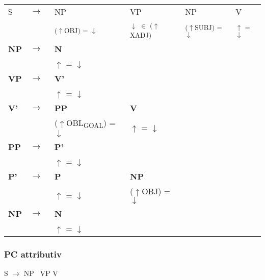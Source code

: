 \documentclass[12pt,a4paper]{article}
\begin{document}
\begin{tabular}{ l  l  l  l  l  l }
  S & $\rightarrow$ & \: \: NP & \: \: VP & \: \: NP & \: V\\
   & $\qquad$ & \textsuperscript{($\uparrow$OBJ) = $\downarrow$} & \textsuperscript{$\downarrow$ $\in$ ($\uparrow$XADJ)} & \textsuperscript{($\uparrow$SUBJ) = $\downarrow$} & \textsuperscript{$\uparrow$ = $\downarrow$} \\
    \textbf{NP} & $\rightarrow$ & \: \textbf{N} \\
   & $\qquad$ & $\uparrow$ = $\downarrow$\\
    \textbf{VP} & $\rightarrow$ & \: \textbf{V'} \\
   & $\qquad$ & $\uparrow$ = $\downarrow$\\
    \textbf{V'} & $\rightarrow$ & \: \: \textbf{PP} & \: \: \: \textbf{V} & \\
   & $\qquad$ &($\uparrow$OBL\textsubscript{GOAL}) = $\downarrow$  & \: $\uparrow$ = $\downarrow$\\
    \textbf{PP} & $\rightarrow$ & \: \: \textbf{P'} \\
	& $\qquad$   & $\uparrow$ = $\downarrow$\\
    \textbf{P'} & $\rightarrow$ & \: \: \textbf{P} & \: \: \textbf{NP} \\
   & $\qquad$ & $\uparrow$ = $\downarrow$ & ($\uparrow$OBJ) = $\downarrow$ \\
    \textbf{NP} & $\rightarrow$ & \: \textbf{N} \\
   & $\qquad$ & $\uparrow$ = $\downarrow$\\
\end{tabular}

\subsubsection{PC attributiv}

S $\rightarrow$ NP \, VP \: V\\
\end{document}
